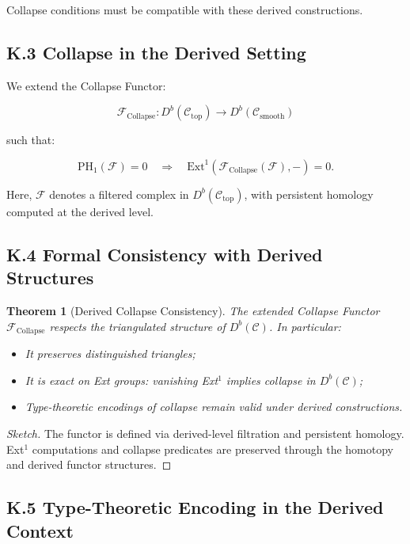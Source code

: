 \documentclass[11pt]{article}
\newtheorem{theorem}{Theorem}[section]
\begin{document}
Collapse conditions must be compatible with these derived constructions.

\subsection*{K.3 Collapse in the Derived Setting}

We extend the Collapse Functor:

\[
\mathcal{F}_{\mathrm{Collapse}} : D^b(\mathcal{C}_{\mathrm{top}}) \to D^b(\mathcal{C}_{\mathrm{smooth}})
\]

such that:

\[
\mathrm{PH}_1(\mathcal{F}) = 0 \quad \Rightarrow \quad \mathrm{Ext}^1(\mathcal{F}_{\mathrm{Collapse}}(\mathcal{F}), -) = 0.
\]

Here, \( \mathcal{F} \) denotes a filtered complex in \( D^b(\mathcal{C}_{\mathrm{top}}) \), with persistent homology computed at the derived level.

\subsection*{K.4 Formal Consistency with Derived Structures}

\begin{theorem}[Derived Collapse Consistency]
The extended Collapse Functor \( \mathcal{F}_{\mathrm{Collapse}} \) respects the triangulated structure of \( D^b(\mathcal{C}) \). In particular:

\begin{itemize}
    \item It preserves distinguished triangles;
    \item It is exact on Ext groups: vanishing Ext$^1$ implies collapse in \( D^b(\mathcal{C}) \);
    \item Type-theoretic encodings of collapse remain valid under derived constructions.
\end{itemize}
\end{theorem}

\begin{proof}[Sketch]
The functor is defined via derived-level filtration and persistent homology. Ext$^1$ computations and collapse predicates are preserved through the homotopy and derived functor structures.
\end{proof}

\subsection*{K.5 Type-Theoretic Encoding in the Derived Context}
\end{document}
